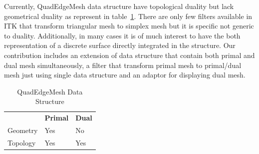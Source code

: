 \documentclass{InsightArticle}
\begin{document}
Currently, QuadEdgeMesh data structure have topological duality but lack geometrical duality as represent in table~\ref{table:existingStructure}. There are only few filters available in ITK that transform triangular mesh to simplex mesh but it is specific not generic to duality. Additionally, in many cases it is of much interest to have the both representation of a discrete surface directly integrated in the structure. Our contribution includes an extension of data structure that contain both primal and dual mesh simultaneously, a filter that transform primal mesh to primal/dual mesh just using single data structure and an adaptor for displaying dual mesh.
\begin{table}
	\begin{center}
		\caption{QuadEdgeMesh Data Structure}
		\label{table:existingStructure}
		\begin{tabular}{ p{3cm} p{3cm} p{3cm} }
			\hline	
			\noalign{\smallskip} 
			{\bf  }	& {\bf Primal} & {\bf Dual} \\
			\noalign{\smallskip}	
			\hline  	
			\noalign{\smallskip}
			Geometry & Yes & No \\ 
			Topology & Yes & Yes \\ 
			\hline
	\end{tabular}
	\end{center}
\end{table}
\end{document}
